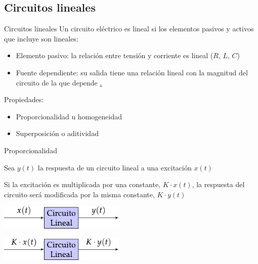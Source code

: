 \documentclass[aspectratio=169, xcolor={usenames,svgnames,dvipsnames}]{beamer}
\begin{document}
\subsection{Circuitos lineales} 

\begin{frame}{Circuitos lineales}
    Un circuito eléctrico es \alert{lineal} si los elementos pasivos y activos que incluye son lineales:
	\begin{itemize}
	    \item \alert{Elemento pasivo}: la relación entre tensión y corriente es lineal ($R$, $L$, $C$)

        \vspace{1mm}
        \item \alert{Fuente dependiente}: su salida tiene una relación lineal con la magnitud del circuito de la que depende 
        \hyperlink{diapo:fuentes_dependientes}{.} %
	\end{itemize}
 
    \vspace{5mm}
    Propiedades:
    \begin{itemize}
        \item \alert{Proporcionalidad} u homogeneidad

        \vspace{1mm}
        \item \alert{Superposición} o aditividad
    \end{itemize}    
 \end{frame}


\begin{frame}{Proporcionalidad}
    \vspace{5mm}
    
    Sea \(y(t)\) la respuesta de un \alert{circuito lineal} a una excitación \(x(t)\) 
    \vspace{5mm}
    
    Si la excitación es multiplicada por una \alert{constante}, \(K \cdot x(t)\), la respuesta del circuito será modificada por la misma constante, \(K \cdot y(t)\)
    \vspace{4mm}
    
    \begin{center}
        \includegraphics[width=0.45\textwidth]{../figs/proporcionalidad.pdf}
        
        \vspace{7mm}
        \includegraphics[width=0.45\textwidth]{../figs/proporcionalidad2.pdf}
    \end{center}
\end{frame}
\end{document}

